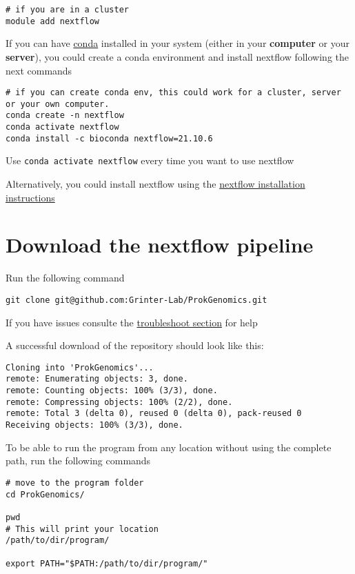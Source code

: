 \documentclass[
]{book}
\begin{document}
\begin{verbatim}
# if you are in a cluster
module add nextflow
\end{verbatim}

If you can have \href{https://conda.io/projects/conda/en/latest/user-guide/getting-started.html}{conda} installed in your system (either in your \textbf{computer} or your \textbf{server}), you could create a conda environment and install nextflow following the next commands

\begin{verbatim}
# if you can create conda env, this could work for a cluster, server or your own computer. 
conda create -n nextflow
conda activate nextflow
conda install -c bioconda nextflow=21.10.6

\end{verbatim}

Use \texttt{conda\ activate\ nextflow} every time you want to use nextflow

Alternatively, you could install nextflow using the \href{https://www.nextflow.io/docs/latest/getstarted.html}{nextflow installation instructions}

\hypertarget{download-the-nextflow-pipeline}{%
\section{Download the nextflow pipeline}\label{download-the-nextflow-pipeline}}

Run the following command

\begin{verbatim}
git clone git@github.com:Grinter-Lab/ProkGenomics.git
\end{verbatim}

If you have issues consulte the \href{troubleshooting.html}{troubleshoot section} for help

A successful download of the repository should look like this:

\begin{verbatim}
Cloning into 'ProkGenomics'...
remote: Enumerating objects: 3, done.
remote: Counting objects: 100% (3/3), done.
remote: Compressing objects: 100% (2/2), done.
remote: Total 3 (delta 0), reused 0 (delta 0), pack-reused 0
Receiving objects: 100% (3/3), done.
\end{verbatim}

To be able to run the program from any location without using the complete path, run the following commands

\begin{verbatim}
# move to the program folder
cd ProkGenomics/

pwd 
# This will print your location
/path/to/dir/program/

export PATH="$PATH:/path/to/dir/program/"
\end{verbatim}
\end{document}
